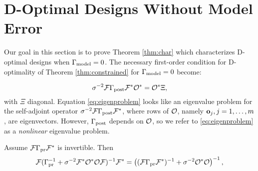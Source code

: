 \section{D-Optimal Designs Without Model Error}\label{section:vanishing}
Our goal in this section is to prove Theorem \ref{thm:char} which
characterizes D-optimal designs when $\Gamma_{\textup{model}} = 0$. The necessary
first-order condition for D-optimality of Theorem
\ref{thm:constrained} for $\Gamma_{\textup{model}} = 0$ become:

\begin{equation}\label{eq:eigenproblem}
  \sigma^{-2}\fwd \postcov \fwd^* \obs^* = \obs^* \Xi,
\end{equation}
with $\Xi$ diagonal. Equation \eqref{eq:eigenproblem} looks like an
eigenvalue problem for the self-adjoint operator $\sigma^{-2}\mathcal{F}
\Gamma_{\textup{post}} \mathcal{F}^*$, where rows of $\mathcal{O}$, namely $\mathbf{o}_j,j=1,\dots, m$,
are eigenvectors. However, $\Gamma_{\textup{post}}$ depends on $\mathcal{O}$, so we refer
to \eqref{eq:eigenproblem} as a \emph{nonlinear} eigenvalue problem.

\begin{proposition}\label{prop:twice woodbury}
  Assume $\mathcal{F} \Gamma_{\textup{pr}} \mathcal{F}^*$ is invertible. Then
  \begin{align*}
    \begin{split}
      \fwd( \prcov^{-1} + \sigma^{-2}  \fwd^* \obs^* \obs \fwd )^{-1} \fwd^* 
      = \left ( (\fwd\prcov\fwd^*)^{-1} + \sigma^{-2}  \obs^* \obs \right )^{-1},
    \end{split}
  \end{align*}  
\end{proposition}

